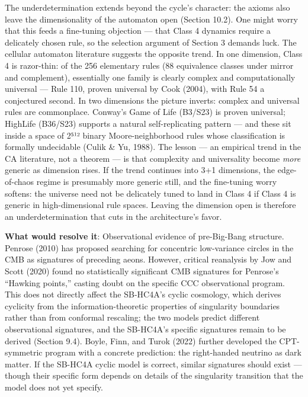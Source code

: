 \documentclass[
]{article}
\begin{document}
The underdetermination extends beyond the cycle's character: the axioms
also leave the dimensionality of the automaton open (Section 10.2). One
might worry that this feeds a fine-tuning objection --- that Class 4
dynamics require a delicately chosen rule, so the selection argument of
Section 3 demands luck. The cellular automaton literature suggests the
opposite trend. In one dimension, Class 4 is razor-thin: of the 256
elementary rules (88 equivalence classes under mirror and complement),
essentially one family is clearly complex and computationally universal
--- Rule 110, proven universal by Cook (2004), with Rule 54 a
conjectured second. In two dimensions the picture inverts: complex and
universal rules are commonplace. Conway's Game of Life (B3/S23) is
proven universal; HighLife (B36/S23) supports a natural self-replicating
pattern --- and these sit inside a space of 2⁵¹² binary
Moore-neighborhood rules whose classification is formally undecidable
(Culik \& Yu, 1988). The lesson --- an empirical trend in the CA
literature, not a theorem --- is that complexity and universality become
\emph{more} generic as dimension rises. If the trend continues into 3+1
dimensions, the edge-of-chaos regime is presumably more generic still,
and the fine-tuning worry softens: the universe need not be delicately
tuned to land in Class 4 if Class 4 is generic in high-dimensional rule
spaces. Leaving the dimension open is therefore an underdetermination
that cuts in the architecture's favor.

\textbf{What would resolve it}: Observational evidence of pre-Big-Bang
structure. Penrose (2010) has proposed searching for concentric
low-variance circles in the CMB as signatures of preceding aeons.
However, critical reanalysis by Jow and Scott (2020) found no
statistically significant CMB signatures for Penrose's ``Hawking
points,'' casting doubt on the specific CCC observational program. This
does not directly affect the SB-HC4A's cyclic cosmology, which derives
cyclicity from the information-theoretic properties of singularity
boundaries rather than from conformal rescaling; the two models predict
different observational signatures, and the SB-HC4A's specific
signatures remain to be derived (Section 9.4). Boyle, Finn, and Turok
(2022) further developed the CPT-symmetric program with a concrete
prediction: the right-handed neutrino as dark matter. If the SB-HC4A
cyclic model is correct, similar signatures should exist --- though
their specific form depends on details of the singularity transition
that the model does not yet specify.
\end{document}
